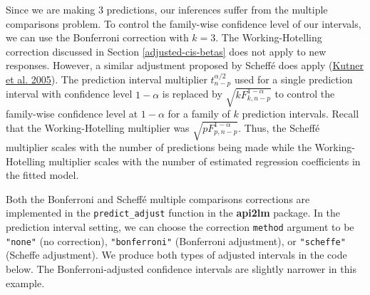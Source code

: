 \documentclass[
]{book}
\theoremstyle{definition}
\theoremstyle{definition}
\theoremstyle{definition}
\theoremstyle{definition}
\theoremstyle{remark}
\begin{document}
Since we are making 3 predictions, our inferences suffer from the multiple comparisons problem. To control the family-wise confidence level of our intervals, we can use the Bonferroni correction with \(k=3\). The Working-Hotelling correction discussed in Section \ref{adjusted-cis-betas} does not apply to new responses. However, a similar adjustment proposed by Scheffé does apply (\protect\hyperlink{ref-alsm2005}{Kutner et al. 2005}). The prediction interval multiplier \(t^{\alpha/2}_{n-p}\) used for a single prediction interval with confidence level \(1-\alpha\) is replaced by
\(\sqrt{k F^{1-\alpha}_{k,n-p}}\) to control the family-wise confidence level at \(1-\alpha\) for a family of \(k\) prediction intervals. Recall that the Working-Hotelling multiplier was \(\sqrt{p F^{1-\alpha}_{p,n-p}}\). Thus, the Scheffé multiplier scales with the number of predictions being made while the Working-Hotelling multiplier scales with the number of estimated regression coefficients in the fitted model.

Both the Bonferroni and Scheffé multiple comparisons corrections are implemented in the \texttt{predict\_adjust} function in the \textbf{api2lm} package. In the prediction interval setting, we can choose the correction \texttt{method} argument to be \texttt{"none"} (no correction), \texttt{"bonferroni"} (Bonferroni adjustment), or \texttt{"scheffe"} (Scheffe adjustment). We produce both types of adjusted intervals in the code below. The Bonferroni-adjusted confidence intervals are slightly narrower in this example.
\end{document}
